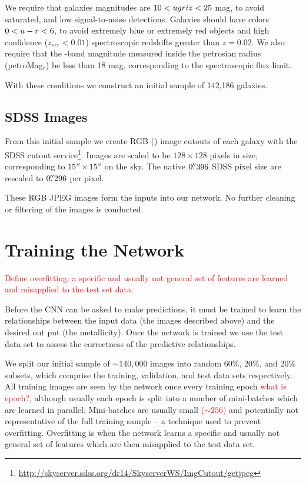\documentclass[fleqn,usenatbib]{mnras}
\newcommand{\editorial}[1]{\textcolor{red}{#1}}
\begin{document}
We require that galaxies magnitudes are $10 < \hbox{$u$} \hbox{$g$} \hbox{$r$} \hbox{$i$} \hbox{$z$} < 25$ mag, to avoid saturated, and low signal-to-noise detections. Galaxies should have colors $0 < \hbox{$u$}-\hbox{$r$} < 6$, to avoid extremely blue or extremely red objects and high confidence ($z_{err} < 0.01$) spectroscopic redshifts greater than $z=0.02$. We also require that the \sdssr-band magnitude measured inside the petrosian radius (petroMag$_r$) be less than 18 mag, corresponding to the spectroscopic flux limit.

With these conditions we construct an initial sample of 142,186 galaxies.

\subsection{SDSS Images}
From this initial sample we create RGB (\sdssi\sdssr\sdssg) image cutouts of each galaxy with the SDSS cutout service\footnote{\url{http://skyserver.sdss.org/dr14/SkyserverWS/ImgCutout/getjpeg}}. Images are scaled to be $128\times128$ pixels in size, corresponding to $15''\times15''$ on the sky. The native $0\hbox{$.\!\!^{\prime\prime}$}396$ SDSS pixel size are rescaled to $0\hbox{$.\!\!^{\prime\prime}$}296$ per pixel.

These RGB JPEG images form the inputs into our network. No further cleaning or filtering of the images is conducted.

\section{Training the Network}\label{sec:training}
\editorial{Define overfitting: a specific and usually not general set of features are learned and misapplied to the test set data.}

Before the CNN can be asked to make predictions, it must be trained to learn the relationships between the input data (the images described above) and the desired out put (the metallicity). Once the network is trained we use the test data set to assess the correctness of the predictive relationships.

We split our initial sample of $\sim 140,000$ images into random 60\%, 20\%, and 20\% subsets, which comprise the training, validation, and test data sets respectively. All training images are seen by the network once every training epoch \editorial{what is epoch?}, although usually each epoch is split into a number of mini-batches which are learned in parallel. Mini-batches are usually small \editorial{($\sim256$)} and potentially not representative of the full training sample -- a technique used to prevent overfitting. Overfitting is when the network learns a specific and usually not general set of features which are then misapplied to the test data set.
\end{document}
